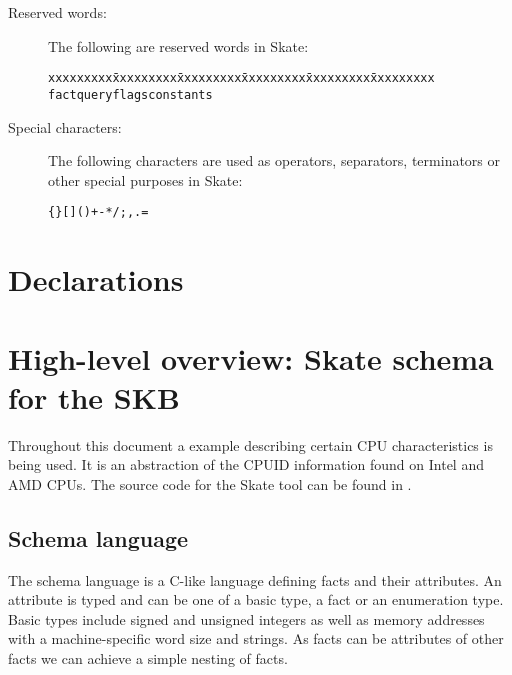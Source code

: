 \documentclass[a4paper,11pt,twoside]{report}
\begin{document}
{{\begin{description}
\item[Reserved words:] The following are reserved words in Skate:
\begin{alltt}
  \begin{tabbing}
xxxxxxxxx \= xxxxxxxxx \= xxxxxxxxx \= xxxxxxxxx \= xxxxxxxxx \= xxxxxxxxx \kill
fact \> query \> flags \> constants \>  \>  \\
  \end{tabbing}
\end{alltt}

\item[Special characters:] The following characters are used as operators,
  separators, terminators or other special purposes in Skate:
\begin{alltt}

  \{ \} [ ] ( ) + - * / ; , . = 

\end{alltt}

\end{description}



\chapter{Declarations}
\label{chap:declaration}




\chapter{High-level overview: Skate schema for the SKB}
\label{chap:overview}




Throughout this document a example describing certain CPU characteristics is
being used. It is an abstraction of the CPUID information found on Intel and AMD
CPUs. The source code for the Skate tool can be found in
.

\section{Schema language}

The schema language is a C-like language defining facts and their attributes. An
attribute is typed and can be one of a basic type, a fact or an enumeration
type. Basic types include signed and unsigned integers as well as memory
addresses with a machine-specific word size and strings. As facts can be
attributes of other facts we can achieve a simple nesting of facts.

}}
\end{document}
